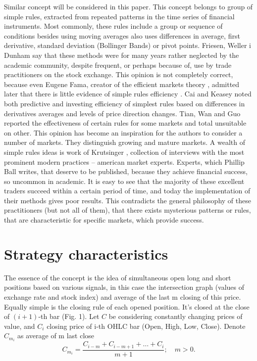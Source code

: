 Similar concept will be considered in this paper. This concept belongs to group of simple rules, extracted from repeated patterns in the time series of financial instruments. Most commonly, these rules include a group or sequence of conditions besides using moving averages also uses differences in average, first derivative, standard deviation (Bollinger Bands) or pivot points. Friesen, Weller i Dunham \cite{friesen09} say that these methods were for many years rather neglected by the academic community, despite frequent, or perhaps because of, use by trade practitioners on the stock exchange. This opinion is not completely correct, because even Eugene Fama, creator of the efficient markets theory \cite{fama91}, admitted later that  there is little evidence of simple rules efficiency \cite{fama98}. Cai and Keasey \cite{cai05} noted both predictive and investing efficiency of simplest rules based on differences in derivatives averages and levels of price direction changes. Tian, Wan and Guo \cite{tian02} reported the effectiveness of certain rules for some markets and total unsuitable on other. This opinion has become an inspiration for the authors to consider a number of markets. They distinguish growing and mature markets. A wealth of simple rules ideas is work of Krutsinger \cite{krutsinger99}, collection of interviews with the most prominent modern practices – american market experts. Experts, which Phillip Ball \cite{ball07} writes, that deserve to be published, because they achieve financial success, so uncommon in academic.
It is easy to see that the majority of these excellent traders succeed within a certain period of time, and today the implementation of their methods gives poor results. This contradicts the general philosophy of these practitioners (but not all of them), that there exists mysterious patterns or rules, that are characteristic for specific markets, which provide success.
\section{Strategy characteristics}
\label{sec:c3StrategyCharacteristics}
\indent The essence of the concept is the idea of simultaneous open long and short positions based on various signals, in this case the intersection graph (values of exchange rate  and stock index) and average of the last m closing of this price.\\
Equally simple is the closing rule of each opened position. It's closed at the close of $(i+1)$-th bar (Fig. 1).
Let $C$ be considering constantly changing prices of value, and $C_i$ closing price of i-th OHLC bar (Open, High, Low, Close). Denote $C_{m_{i}}$ as average of m last close
\begin{equation} \label{label-of-equation-1}
  C_{m_{i}} = \frac{C_{i-m} + C_{i-m+1} + … + C_{i}}{m+1}; \hspace{1em}m>0. 
\end{equation}
 
